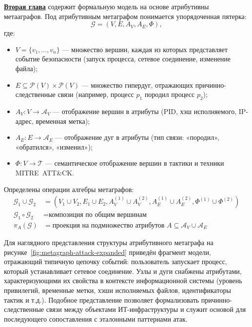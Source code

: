 \underline{\textbf{Вторая глава}} содержит формальную модель на основе атрибутивны метааграфов. Под атрибутивным метаграфом понимается упорядоченная пятерка:
\begin{equation}
\mathcal{G} = \left( V, E, A_V, A_E, \Phi \right),
\end{equation}
где:
\begin{itemize}
    \item \(V = \{v_1, \dots, v_n\}\) — множество вершин, каждая из которых представляет событие безопасности (запуск процесса, сетевое соединение, изменение файла);
    \item \(E \subseteq \mathcal{P}(V) \times \mathcal{P}(V)\) — множество гипердуг, отражающих причинно-следственные связи (например, процесс \(p_1\) породил процесс \(p_2\));
    \item \(A_V: V \to \mathcal{A}_V\) — отображение вершин в атрибуты (PID, хэш исполняемого, IP-адрес, временная метка);
    \item \(A_E: E \to \mathcal{A}_E\) — отображение дуг в атрибуты (тип связи: «породил», «обратился», «изменил»);
    \item \(\Phi: V \to \mathcal{T}\) — семантическое отображение вершин в тактики и техники MITRE~ATT\&CK.
\end{itemize}

Определены операции алгебры метаграфов:
\begin{align}
\mathcal{G}_1 \cup \mathcal{G}_2 &= (V_1 \cup V_2, E_1 \cup E_2, A_V^{(1)} \cup A_V^{(2)}, A_E^{(1)} \cup A_E^{(2)}, \Phi^{(1)} \cup \Phi^{(2)}) \\
\mathcal{G}_1 \circ \mathcal{G}_2 &= \text{композиция по общим вершинам} \\
\pi_{A}(\mathcal{G}) &= \text{проекция на подмножество атрибутов } A \subseteq \mathcal{A}_V \cup \mathcal{A}_E
\end{align}

Для наглядного представления структуры атрибутивного метаграфа на рисунке~\ref{fig:metagraph-attack-expanded} приведён фрагмент модели, отражающий типичную цепочку событий: пользователь запускает процесс, который устанавливает сетевое соединение. Узлы и дуги снабжены атрибутами, характеризующими их свойства в контексте информационной системы (уровень привилегий, временные метки, хэши исполняемых файлов, идентификаторы тактик и т.д.). Подобное представление позволяет формализовать причинно-следственные связи между объектами ИТ-инфраструктуры и служит основой для последующего сопоставления с эталонными паттернами атак.

